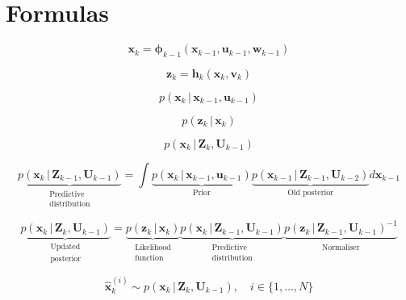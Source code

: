 \chapter{Formulas}


\begin{equation}
  \bm{x}_k = \bm{\phi}_{k-1}(\bm{x}_{k-1}, \bm{u}_{k-1}, \bm{w}_{k-1})
\end{equation}

\begin{equation}
  \bm{z}_k = \bm{h}_{k}(\bm{x}_{k}, \bm{v}_{k})
\end{equation}

\begin{equation}
  p(\bm{x}_k\,|\,\bm{x}_{k-1}, \bm{u}_{k-1})
\end{equation}

\begin{equation}
  p(\bm{z}_k\,|\,\bm{x}_{k})
\end{equation}

\begin{equation}
  p(\bm{x}_k\,|\,\bm{Z}_{k}, \bm{U}_{k-1})
\end{equation}

\begin{equation}
  \underbrace{p(\bm{x}_k\,|\,\bm{Z}_{k-1}, \bm{U}_{k-1})}_{\substack{\text{Predictive} \\ \text{distribution}}} = \int \underbrace{p(\bm{x}_k\,|\,\bm{x}_{k-1}, \bm{u}_{k-1})}_\text{Prior} \underbrace{p(\bm{x}_{k-1}\,|\,\bm{Z}_{k-1}, \bm{U}_{k-2})}_\text{Old posterior} d\bm{x}_{k-1}
\end{equation}

\begin{equation}
  \underbrace{p(\bm{x}_k\,|\,\bm{Z}_{k}, \bm{U}_{k-1})}_{\substack{\text{Updated} \\ \text{posterior}}} = \underbrace{p(\bm{z}_k\,|\,\bm{x}_{k})}_{\substack{\text{Likelihood} \\ \text{function}}} \underbrace{p(\bm{x}_k\,|\,\bm{Z}_{k-1}, \bm{U}_{k-1})}_{\substack{\text{Predictive} \\ \text{distribution}}} \underbrace{p(\bm{z}_k\,|\,\bm{Z}_{k-1}, \bm{U}_{k-1})^{-1}}_{\substack{\text{Normaliser}}}
\end{equation}

\begin{equation}
  \hat{\bm{x}}^{(i)}_k \sim p(\bm{x}_k\,|\,\bm{Z}_{k}, \bm{U}_{k-1}), \quad i \in \{1, \dots, N\} 
\end{equation}

